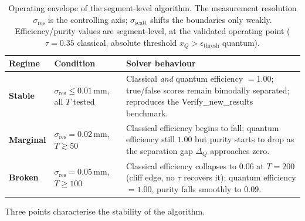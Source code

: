 \documentclass[11pt,a4paper]{article}
\newcommand{\sres}{\sigma_{\mathrm{res}}}
\newcommand{\sscat}{\sigma_{\mathrm{scatt}}}
\newcommand{\ntrk}{T}
\newcommand{\Qthresh}{\epsilon_{\mathrm{thresh}}}
\begin{document}
\begin{table}[H]
  \centering
  \caption{Operating envelope of the segment-level algorithm. The measurement
    resolution $\sres$ is the controlling axis; $\sscat$ shifts the boundaries only
    weakly. Efficiency/purity values are segment-level, at the validated operating
    point ($\tau=0.35$ classical, absolute threshold $x_Q>\Qthresh$ quantum).}
  \label{tab:stability}
  \small
  \begin{tabular}{p{1.7cm}p{4.2cm}p{7.2cm}}
    \toprule
    Regime & Condition & Solver behaviour \\
    \midrule
    \textbf{Stable} & $\sres\leq0.01\,\mathrm{mm}$, all $\ntrk$ tested &
      Classical \emph{and} quantum efficiency $=1.00$; true/false scores remain
      bimodally separated; reproduces the Verify\_new\_results benchmark. \\[2pt]
    \textbf{Marginal} & $\sres=0.02\,\mathrm{mm}$, $\ntrk\gtrsim50$ &
      Classical efficiency begins to fall; quantum efficiency still $1.00$ but
      purity starts to drop as the separation gap $\Delta_Q$ approaches zero. \\[2pt]
    \textbf{Broken} & $\sres=0.05\,\mathrm{mm}$, $\ntrk\geq100$ &
      Classical efficiency collapses to $0.06$ at $\ntrk=200$ (cliff edge, no $\tau$
      recovers it); quantum efficiency $=1.00$, purity falls smoothly to $0.09$. \\
    \bottomrule
  \end{tabular}
\end{table}

Three points characterise the stability of the algorithm.
\end{document}
